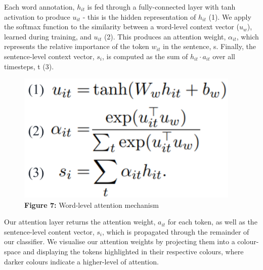 \documentclass[12pt,a4paper]{article}
\begin{document}
\hspace{-17pt}\begin{minipage}{0.65\textwidth}
	 Each word annotation, $h_{it}$ is fed through a fully-connected layer with tanh activation to produce $u_{it}$ - this is the hidden representation of $h_{it}$ (1). We apply the softmax function to the similarity between a word-level context vector ($u_w$), learned during training, and $u_{it}$ (2). This produces an attention weight, $\alpha_{it}$, which represents the relative importance of the token $w_{it}$ in the sentence, s. Finally, the sentence-level context vector, $s_i$, is computed as the sum of $h_{it} \cdot a_{it}$ over all timesteps, t (3).
\end{minipage}
\hspace{2pt}
\begin{minipage}{0.35\textwidth}
\begin{figure}[H]
	\begin{center}
		\includegraphics[width=0.95\textwidth]{Images/wordLevelAttention.png}\\
		\textbf{Figure 7:} Word-level attention mechanism\cite{yang2016hierarchical}\\
	\end{center}
\end{figure}
\end{minipage}\vspace{-5pt}

\noindent Our attention layer returns the attention weight, $a_{it}$ for each token, as well as the sentence-level content vector, $s_i$, which is propagated through the remainder of our classifier. We visualise our attention weights by projecting them into a colour-space and displaying the tokens highlighted in their respective colours, where darker colours indicate a higher-level of attention.
\end{document}
